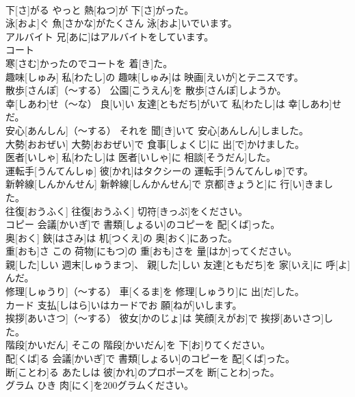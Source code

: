 \documentclass[8pt]{extreport}
\begin{document}
\begin{CJK}{UTF8}{min}
\\	下[さ]がる	やっと 熱[ねつ]が 下[さ]がった。		
\\	泳[およ]ぐ	魚[さかな]がたくさん 泳[およ]いでいます。		
\\	アルバイト	兄[あに]はアルバイトをしています。		
\\	コート
\\	寒[さむ]かったのでコートを 着[き]た。		
\\	趣味[しゅみ]	私[わたし]の 趣味[しゅみ]は 映画[えいが]とテニスです。		
\\	散歩[さんぽ]（～する）	公園[こうえん]を 散歩[さんぽ]しようか。		
\\	幸[しあわ]せ（～な）	良[い]い 友達[ともだち]がいて 私[わたし]は 幸[しあわ]せだ。		
\\	安心[あんしん]（～する）	それを 聞[き]いて 安心[あんしん]しました。		
\\	大勢[おおぜい]	大勢[おおぜい]で 食事[しょくじ]に 出[で]かけました。		
\\	医者[いしゃ]	私[わたし]は 医者[いしゃ]に 相談[そうだん]した。		
\\	運転手[うんてんしゅ]	彼[かれ]はタクシーの 運転手[うんてんしゅ]です。		
\\	新幹線[しんかんせん]	新幹線[しんかんせん]で 京都[きょうと]に 行[い]きました。		
\\	往復[おうふく]	往復[おうふく] 切符[きっぷ]をください。		
\\	コピー	会議[かいぎ]で 書類[しょるい]のコピーを 配[くば]った。		
\\	奥[おく]	鋏[はさみ]は 机[つくえ]の 奥[おく]にあった。		
\\	重[おも]さ	この 荷物[にもつ]の 重[おも]さを 量[はか]ってください。		
\\	親[した]しい	週末[しゅうまつ]、 親[した]しい 友達[ともだち]を 家[いえ]に 呼[よ]んだ。		
\\	修理[しゅうり]（～する）	車[くるま]を 修理[しゅうり]に 出[だ]した。		
\\	カード	支払[しはら]いはカードでお 願[ねが]いします。		
\\	挨拶[あいさつ]（～する）	彼女[かのじょ]は 笑顔[えがお]で 挨拶[あいさつ]した。		
\\	階段[かいだん]	そこの 階段[かいだん]を 下[お]りてください。		
\\	配[くば]る	会議[かいぎ]で 書類[しょるい]のコピーを 配[くば]った。		
\\	断[ことわ]る	あたしは 彼[かれ]のプロポーズを 断[ことわ]った。		
\\	グラム	ひき 肉[にく]を200グラムください。		

\end{CJK}
\end{document}
